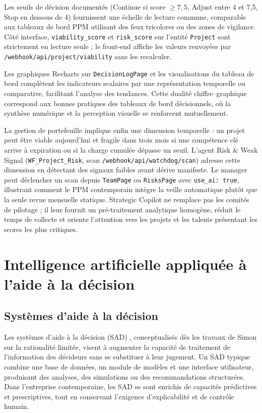 Les seuils de décision documentés (Continue si score $\geq 7{,}5$, Adjust entre 4 et 7{,}5, Stop en dessous de 4) fournissent une échelle de lecture commune, comparable aux tableaux de bord PPM utilisant des feux tricolores ou des zones de vigilance. Côté interface, \texttt{viability\_score} et \texttt{risk\_score} sur l'entité \texttt{Project} sont strictement en lecture seule ; le front-end affiche les valeurs renvoyées par \texttt{/webhook/api/project/viability} sans les recalculer.

Les graphiques Recharts sur \texttt{DecisionLogPage} et les visualisations du tableau de bord complètent les indicateurs scalaires par une représentation temporelle ou comparative, facilitant l'analyse des tendances. Cette dualité chiffre--graphique correspond aux bonnes pratiques des tableaux de bord décisionnels, où la synthèse numérique et la perception visuelle se renforcent mutuellement.

La gestion de portefeuille implique enfin une dimension temporelle : un projet peut être viable aujourd'hui et fragile dans trois mois si une compétence clé arrive à expiration ou si la charge cumulée dépasse un seuil. L'agent Risk \& Weak Signal (\texttt{WF\_Project\_Risk}, scan \texttt{/webhook/api/watchdog/scan}) adresse cette dimension en détectant des signaux faibles avant dérive manifeste. Le manager peut déclencher un scan depuis \texttt{TeamPage} ou \texttt{RisksPage} avec \texttt{use\_ai: true}, illustrant comment le PPM contemporain intègre la veille automatique plutôt que la seule revue mensuelle statique. Strategic Copilot ne remplace pas les comités de pilotage ; il leur fournit un pré-traitement analytique homogène, réduit le temps de collecte et oriente l'attention vers les projets et les talents présentant les scores les plus critiques.

\section{Intelligence artificielle appliquée à l'aide à la décision}

\subsection{Systèmes d'aide à la décision}

Les systèmes d'aide à la décision (SAD) \cite{simon1997,turban2018,arnott2005}, conceptualisés dès les travaux de Simon sur la rationalité limitée, visent à augmenter la capacité de traitement de l'information des décideurs sans se substituer à leur jugement. Un SAD typique combine une base de données, un module de modèles et une interface utilisateur, produisant des analyses, des simulations ou des recommandations structurées. Dans l'entreprise contemporaine, les SAD se sont enrichis de capacités prédictives et prescriptives, tout en conservant l'exigence d'explicabilité et de contrôle humain.

